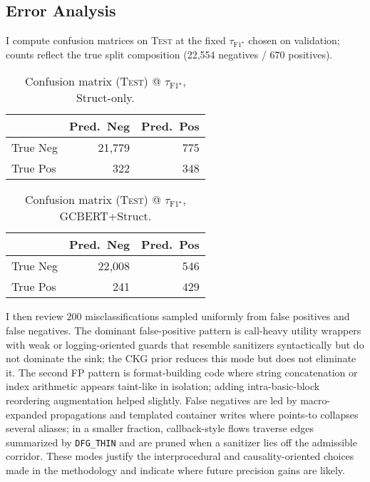 \documentclass{buthesis}
\begin{document}
\subsection{Error Analysis}
\label{subsec:conv-errors}

I compute confusion matrices on \textsc{Test} at the fixed \(\tau_{\text{F1}^\star}\) chosen on validation; counts reflect the true split composition (22,554 negatives / 670 positives).

\begin{table}[H]
\centering
\small
\caption{Confusion matrix (\textsc{Test}) @ $\tau_{\text{F1}^\star}$, Struct-only.}
\label{tab:cm-struct}
\begin{tabular}{l r r}
\toprule
 & Pred.\ Neg & Pred.\ Pos \\
\midrule
True Neg & 21{,}779 & 775 \\
True Pos & 322 & 348 \\
\bottomrule
\end{tabular}
\end{table}

\begin{table}[H]
\centering
\small
\caption{Confusion matrix (\textsc{Test}) @ $\tau_{\text{F1}^\star}$, GCBERT+Struct.}
\label{tab:cm-gcbert}
\begin{tabular}{l r r}
\toprule
 & Pred.\ Neg & Pred.\ Pos \\
\midrule
True Neg & 22{,}008 & 546 \\
True Pos & 241 & 429 \\
\bottomrule
\end{tabular}
\end{table}

I then review 200 misclassifications sampled uniformly from false positives and false negatives. The dominant false-positive pattern is call-heavy utility wrappers with weak or logging-oriented guards that resemble sanitizers syntactically but do not dominate the sink; the CKG prior reduces this mode but does not eliminate it. The second FP pattern is format-building code where string concatenation or index arithmetic appears taint-like in isolation; adding intra-basic-block reordering augmentation helped slightly. False negatives are led by macro-expanded propagations and templated container writes where points-to collapses several aliases; in a smaller fraction, callback-style flows traverse edges summarized by \texttt{DFG\_THIN} and are pruned when a sanitizer lies off the admissible corridor. These modes justify the interprocedural and causality-oriented choices made in the methodology and indicate where future precision gains are likely.
\end{document}
